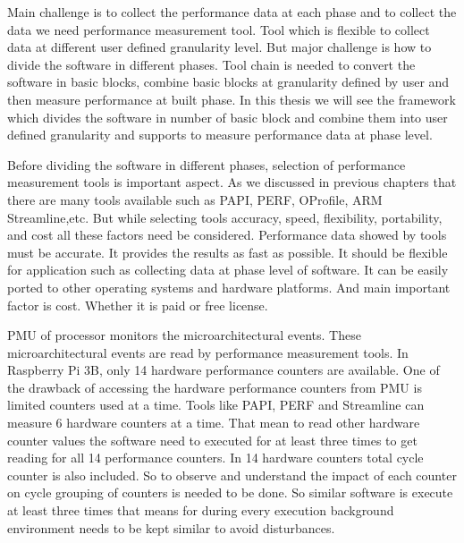 \par Main challenge is to collect the performance data at each phase and to collect the data we need performance measurement tool. Tool which is flexible to collect data at different user defined granularity level. But major challenge is how to divide the software in different phases. Tool chain is needed to convert the software in basic blocks, combine basic blocks at granularity defined by user and then measure performance at built phase. In this thesis we will see the framework which divides the software in number of basic block and combine them into user defined granularity and supports to measure performance data at phase level. 

\par Before dividing the software in different phases, selection of performance measurement tools is important aspect. As we discussed in previous chapters that there are many tools available such as PAPI, PERF, OProfile, ARM Streamline,etc. But while selecting tools accuracy, speed, flexibility, portability, and cost all these factors need be considered. Performance data showed by tools must be accurate. It provides the results as fast as possible. It should be flexible for application such as collecting data at phase level of software. It can be easily ported to other operating systems and hardware platforms. And main important factor is cost. Whether it is paid or free license. 

\par PMU of processor monitors the microarchitectural events. These microarchitectural events are read by performance measurement tools. In Raspberry Pi 3B, only 14 hardware performance counters are available. One of the drawback of accessing the hardware performance counters from PMU is limited counters used at a time. Tools like PAPI, PERF and Streamline can measure 6 hardware counters at a time. That mean to read other hardware counter values the software need to executed for at least three times to get reading for all 14 performance counters. In 14 hardware counters total cycle counter is also included. So to observe and understand the impact of each counter on cycle grouping of counters is needed to be done. So similar software is execute at least three times that means for during every execution background environment needs to be kept similar to avoid disturbances. 


